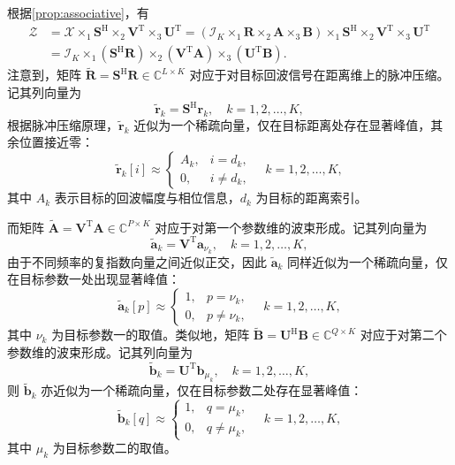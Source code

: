 根据\cref{prop:associative}，有
\[
\begin{split}
    \mathcal{Z} 
    & = \mathcal{X} \times_1 \mathbf{S}^{\mathrm{H}} \times_2 \mathbf{V}^{\mathrm{T}} \times_3 \mathbf{U}^{\mathrm{T}} 
      = \left( \mathcal{I}_K \times_1 \mathbf{R} \times_2 \mathbf{A} \times_3 \mathbf{B} \right) 
        \times_1 \mathbf{S}^{\mathrm{H}} \times_2 \mathbf{V}^{\mathrm{T}} \times_3 \mathbf{U}^{\mathrm{T}} \\
    & = \mathcal{I}_K \times_1 \left( \mathbf{S}^{\mathrm{H}} \mathbf{R} \right) 
                   \times_2 \left( \mathbf{V}^{\mathrm{T}} \mathbf{A} \right) 
                   \times_3 \left( \mathbf{U}^{\mathrm{T}} \mathbf{B} \right).
\end{split}
\]
注意到，矩阵 \( \tilde{\mathbf{R}} = \mathbf{S}^{\mathrm{H}} \mathbf{R} \in \mathbb{C}^{L \times K} \) 对应于对目标回波信号在距离维上的脉冲压缩。记其列向量为
\[
    \tilde{\bm{r}}_k = \mathbf{S}^{\mathrm{H}} \bm{r}_k, 
    \quad k=1,2,\dots,K,
\]
根据脉冲压缩原理，\( \tilde{\bm{r}}_k \) 近似为一个稀疏向量，仅在目标距离处存在显著峰值，其余位置接近零：
\[
    \tilde{\bm{r}}_k[i] \approx 
    \begin{cases}
        A_k, & i = d_k, \\
        0,   & i \neq d_k,
    \end{cases}
    \quad k=1,2,\dots,K,
\]
其中 \( A_k \) 表示目标的回波幅度与相位信息，\( d_k \) 为目标的距离索引。  

而矩阵 \( \tilde{\mathbf{A}} =  \mathbf{V}^{\mathrm{T}} \mathbf{A} \in \mathbb{C}^{P \times K} \) 对应于对第一个参数维的波束形成。记其列向量为
\[
    \tilde{\bm{a}}_k = \mathbf{V}^{\mathrm{T}} \bm{a}_{\nu_k}, 
    \quad k=1,2,\dots,K,
\]
由于不同频率的复指数向量之间近似正交，因此 \( \tilde{\bm{a}}_k \) 同样近似为一个稀疏向量，仅在目标参数一处出现显著峰值：
\[
    \tilde{\bm{a}}_k[p] \approx 
    \begin{cases}
        1, & p = \nu_k, \\
        0, & p \neq \nu_k,
    \end{cases}
    \quad k=1,2,\dots,K,
\]
其中 \( \nu_k \) 为目标参数一的取值。类似地，矩阵 \(  \tilde{\mathbf{B}} = \mathbf{U}^{\mathrm{H}} \mathbf{B} \in \mathbb{C}^{Q \times K} \) 对应于对第二个参数维的波束形成。记其列向量为
\[
    \tilde{\bm{b}}_k = \mathbf{U}^{\mathrm{T}} \bm{b}_{\mu_k}, 
    \quad k=1,2,\dots,K,
\]
则 \( \tilde{\bm{b}}_k \) 亦近似为一个稀疏向量，仅在目标参数二处存在显著峰值：
\[
    \tilde{\bm{b}}_k[q] \approx 
    \begin{cases}
        1, & q = \mu_k, \\
        0, & q \neq \mu_k,
    \end{cases}
    \quad k=1,2,\dots,K,
\]
其中 \( \mu_k \) 为目标参数二的取值。

